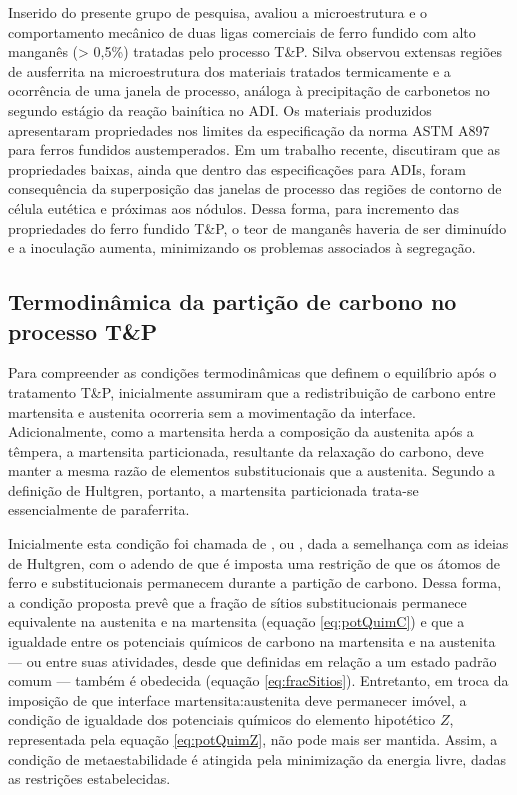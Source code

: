 Inserido do presente grupo de pesquisa,  avaliou a microestrutura e o comportamento mecânico de duas ligas comerciais de ferro fundido com alto manganês (> 0,5\%) tratadas pelo processo T\&P. Silva observou extensas regiões de ausferrita na microestrutura dos materiais tratados termicamente e a ocorrência de uma janela de processo, análoga à precipitação de carbonetos no segundo estágio da reação bainítica no ADI. Os materiais produzidos apresentaram propriedades nos limites da especificação da norma ASTM A897 para ferros fundidos austemperados. Em um trabalho recente,  discutiram que as propriedades baixas, ainda que dentro das especificações para ADIs, foram consequência da superposição das janelas de processo das regiões de contorno de célula eutética e próximas aos nódulos. Dessa forma, para incremento das propriedades do ferro fundido T\&P, o teor de manganês haveria de ser diminuído e a inoculação aumenta, minimizando os problemas associados à segregação.


\subsection{Termodin\^{a}mica da parti\c{c}\~{a}o de carbono no processo T\&P}

Para compreender as condições termodinâmicas que definem o equilíbrio após o tratamento T\&P,  inicialmente assumiram que a redistribuição de carbono entre martensita e austenita ocorreria sem a movimentação da interface. Adicionalmente, como a martensita herda a composição da austenita após a têmpera, a martensita particionada, resultante da relaxação do carbono, deve manter a mesma razão de elementos substitucionais que a austenita. Segundo a definição de Hultgren, portanto, a martensita particionada trata-se essencialmente de paraferrita.

Inicialmente esta condição foi chamada de , ou , dada a semelhança com as ideias de Hultgren, com o adendo de que é imposta uma restrição de que os átomos de ferro e substitucionais permanecem  durante a partição de carbono. Dessa forma, a condição proposta prevê que a fração de sítios substitucionais permanece equivalente na austenita e na martensita (equação \ref{eq:potQuimC}) e que a igualdade entre os potenciais químicos de carbono na martensita e na austenita --- ou entre suas atividades, desde que definidas em relação a um estado padrão comum --- também é obedecida (equação \ref{eq:fracSitios}). Entretanto, em troca da imposição de que interface martensita:austenita deve permanecer imóvel, a condição de igualdade dos potenciais químicos do elemento hipotético $Z$, representada pela equação \ref{eq:potQuimZ}, não pode mais ser mantida. Assim, a condição de metaestabilidade é atingida pela minimização da energia livre, dadas as restrições estabelecidas.

